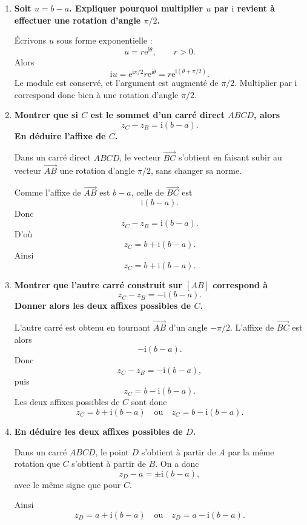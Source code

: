 \documentclass[11pt,a4paper]{article}
\newcommand{\ii}{\mathrm{i}}
\newcommand{\e}{\mathrm{e}}
\begin{document}
\begin{enumerate}[label=\textbf{\arabic*.}]
    \item \textbf{Soit \(u=b-a\). Expliquer pourquoi multiplier \(u\) par \(\ii\) revient à effectuer une rotation d’angle \(\pi/2\).}

    Écrivons \(u\) sous forme exponentielle :
    \[
    u=r\e^{\ii\theta},\qquad r>0.
    \]
    Alors
    \[
    \ii u=\e^{\ii\pi/2}r\e^{\ii\theta}=r\e^{\ii(\theta+\pi/2)}.
    \]
    Le module est conservé, et l’argument est augmenté de \(\pi/2\). Multiplier par \(\ii\) correspond donc bien à une rotation d’angle \(\pi/2\).

    \item \textbf{Montrer que si \(C\) est le sommet d’un carré direct \(ABCD\), alors
    \[
    z_C-z_B=\ii(b-a).
    \]
    En déduire l’affixe de \(C\).}

    Dans un carré direct \(ABCD\), le vecteur \(\overrightarrow{BC}\) s’obtient en faisant subir au vecteur \(\overrightarrow{AB}\) une rotation d’angle \(\pi/2\), sans changer sa norme.

    Comme l’affixe de \(\overrightarrow{AB}\) est \(b-a\), celle de \(\overrightarrow{BC}\) est
    \[
    \ii(b-a).
    \]
    Donc
    \[
    z_C-z_B=\ii(b-a).
    \]
    D’où
    \[
    z_C=b+\ii(b-a).
    \]
    Ainsi
    \[
    \boxed{z_C=b+\ii(b-a).}
    \]

    \item \textbf{Montrer que l’autre carré construit sur \([AB]\) correspond à
    \[
    z_C-z_B=-\ii(b-a).
    \]
    Donner alors les deux affixes possibles de \(C\).}

    L’autre carré est obtenu en tournant \(\overrightarrow{AB}\) d’un angle \(-\pi/2\). L’affixe de \(\overrightarrow{BC}\) est alors
    \[
    -\ii(b-a).
    \]
    Donc
    \[
    z_C-z_B=-\ii(b-a),
    \]
    puis
    \[
    z_C=b-\ii(b-a).
    \]
    Les deux affixes possibles de \(C\) sont donc
    \[
    \boxed{z_C=b+\ii(b-a)\quad\text{ou}\quad z_C=b-\ii(b-a).}
    \]

    \item \textbf{En déduire les deux affixes possibles de \(D\).}

    Dans un carré \(ABCD\), le point \(D\) s’obtient à partir de \(A\) par la même rotation que \(C\) s’obtient à partir de \(B\). On a donc
    \[
    z_D-a=\pm\ii(b-a),
    \]
    avec le même signe que pour \(C\).

    Ainsi
    \[
    \boxed{z_D=a+\ii(b-a)\quad\text{ou}\quad z_D=a-\ii(b-a).}
    \]


\end{enumerate}
\end{document}
